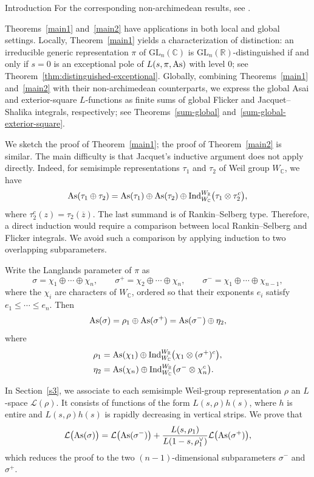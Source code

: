 \documentclass[12pt,reqno]{amsart}
\numberwithin{equation}{section}%
\numberwithin{equation}{subsection}
\theoremstyle{definition}
\theoremstyle{remark}
\begin{document}
\begin{section}{Introduction}
For the corresponding non-archimedean results, see \cite{KR2012,Jo2020}.



Theorems~\ref{main1} and~\ref{main2} have applications in both
local and global settings. Locally, Theorem~\ref{main1} yields a
characterization of distinction: an irreducible generic representation
$\pi$ of $\mathrm{GL}_n(\mathbb{C})$ is
$\mathrm{GL}_n(\mathbb{R})$-distinguished if and only if $s=0$ is an
exceptional pole of $L(s,\pi,{\rm As})$ with level $0$; see
Theorem~\ref{thm:distinguished-exceptional}. Globally, combining Theorems~\ref{main1} and~\ref{main2} with their non-archimedean counterparts, we express the global Asai and exterior-square $L$-functions as finite sums of global Flicker and Jacquet--Shalika integrals, respectively; see Theorems~\ref{sum-global} and~\ref{sum-global-exterior-square}.

We sketch the proof of Theorem~\ref{main1}; the proof of
Theorem~\ref{main2} is similar. The main difficulty is that Jacquet's
inductive argument \cite{Jac2009} does not apply directly. Indeed, for
semisimple representations \(\tau_1\) and \(\tau_2\) of Weil group
\(W_{\mathbb C}\), we have
\[
{\rm As}(\tau_1\oplus\tau_2)
=
{\rm As}(\tau_1)\oplus{\rm As}(\tau_2)\oplus
\operatorname{Ind}_{W_{\mathbb C}}^{W_{\mathbb R}}
\bigl(\tau_1\otimes\tau_2^c\bigr),
\]
where \(\tau_2^c(z)=\tau_2(\overline z)\). The last summand is of
Rankin--Selberg type. Therefore, a direct induction would require a
comparison between local Rankin--Selberg and Flicker integrals. We avoid such a comparison by applying induction to two
overlapping subparameters.

Write the Langlands parameter of \(\pi\) as
\[
\sigma=\chi_1\oplus\cdots\oplus\chi_n,
\qquad
\sigma^+=\chi_2\oplus\cdots\oplus\chi_n,
\qquad
\sigma^-=\chi_1\oplus\cdots\oplus\chi_{n-1},
\]
where the \(\chi_i\) are characters of 
\(W_{\mathbb{C}}\), ordered so that their exponents \(e_i\) satisfy
$e_1\leq\cdots\leq e_n.$ 
Then
\[
{\rm As}(\sigma)
=
\rho_1\oplus{\rm As}(\sigma^+)
=
{\rm As}(\sigma^-)\oplus\eta_2,
\]
where
\[
\begin{aligned}
\rho_1&={\rm As}(\chi_1)\oplus
\operatorname{Ind}_{W_{\mathbb{C}}}^{W_{\mathbb{R}}}
\bigl(\chi_1\otimes(\sigma^+)^c\bigr),\\
\eta_2&={\rm As}(\chi_n)\oplus
\operatorname{Ind}_{W_{\mathbb{C}}}^{W_{\mathbb{R}}}
\bigl(\sigma^-\otimes\chi_n^c\bigr).
\end{aligned}
\]

In Section~\ref{s3}, we associate to each semisimple Weil-group representation \(\rho\) an \(L\)-space \(\mathcal{L}(\rho)\). It consists of functions of the form \(L(s,\rho)h(s)\), where \(h\) is entire and \(L(s,\rho)h(s)\) is rapidly decreasing in vertical strips. We prove that
\[
\mathcal{L}\bigl({\rm As}(\sigma)\bigr)
=
\mathcal{L}\bigl({\rm As}(\sigma^-)\bigr)
+
\frac{L(s,\rho_1)}{L(1-s,\rho_1^\vee)}
\mathcal{L}\bigl({\rm As}(\sigma^+)\bigr),
\]
which reduces the proof to the two \((n-1)\)-dimensional subparameters \(\sigma^-\) and \(\sigma^+\).


\end{section}
\end{document}
